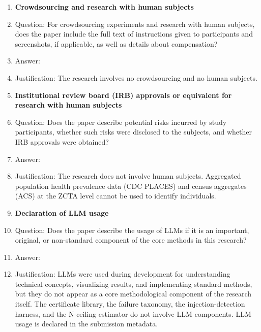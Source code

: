 \documentclass{article}
\begin{document}
\begin{enumerate}
\item {\bf Crowdsourcing and research with human subjects}
    \item[] Question: For crowdsourcing experiments and research with human subjects, does the paper include the full text of instructions given to participants and screenshots, if applicable, as well as details about compensation?
    \item[] Answer: \answerNA{}
    \item[] Justification: The research involves no crowdsourcing and no human subjects.

\item {\bf Institutional review board (IRB) approvals or equivalent for research with human subjects}
    \item[] Question: Does the paper describe potential risks incurred by study participants, whether such risks were disclosed to the subjects, and whether IRB approvals were obtained?
    \item[] Answer: \answerNA{}
    \item[] Justification: The research does not involve human subjects. Aggregated population health prevalence data (CDC PLACES) and census aggregates (ACS) at the ZCTA level cannot be used to identify individuals.

\item {\bf Declaration of LLM usage}
    \item[] Question: Does the paper describe the usage of LLMs if it is an important, original, or non-standard component of the core methods in this research?
    \item[] Answer: \answerNo{}
    \item[] Justification: LLMs were used during development for understanding technical concepts, visualizing results, and implementing standard methods, but they do not appear as a core methodological component of the research itself. The certificate library, the failure taxonomy, the injection-detection harness, and the N-ceiling estimator do not involve LLM components. LLM usage is declared in the submission metadata.

\end{enumerate}
\end{document}
